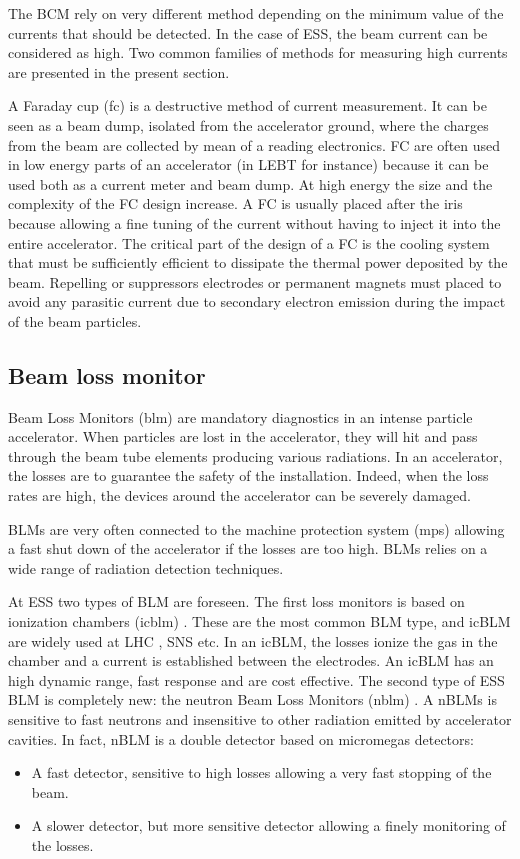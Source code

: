 \begin{refsection}
  The BCM rely on very different method depending on the minimum value of the currents that should be detected. In the case of ESS, the beam current can be considered as high. Two common families of methods for measuring high currents are presented in the present section.

  A Faraday cup (\acrshort{fc}) is a destructive method of current measurement. It can be seen as a beam dump, isolated from the accelerator ground, where the charges from the beam are collected by mean of a reading electronics. FC are often used in low energy parts of an accelerator (in LEBT for instance) because it can be used both as a current meter and beam dump. At high energy the size and the complexity of the FC design increase. A FC is usually placed after the iris because allowing a fine tuning of the current without having to inject it into the entire accelerator. The critical part of the design of a FC is the cooling system that must be sufficiently efficient to dissipate the thermal power deposited by the beam. Repelling or suppressors electrodes or permanent magnets must placed to avoid any parasitic current due to secondary electron emission during the impact of the beam particles.

  
  \subsection{Beam loss monitor}
  Beam Loss Monitors (\acrshort{blm}) are mandatory diagnostics in an intense particle accelerator. When particles are lost in the accelerator, they will hit and pass through the beam tube elements producing various radiations. In an accelerator, the losses are  to guarantee the safety of the installation. Indeed, when the loss rates are high, the devices around the accelerator can be severely damaged.

  BLMs are very often connected to the machine protection system (\acrshort{mps}) allowing a fast shut down of the accelerator if the losses are too high. BLMs relies on a wide range of radiation detection techniques.

  At ESS two types of BLM are foreseen. The first loss monitors is based on ionization chambers (\acrshort{icblm}) \cite{Grishin:IBIC2017-WEPWC03}. These are the most common BLM type, and icBLM are widely used at LHC \cite{HOLZER20122055}, SNS etc. In an icBLM, the losses ionize the gas in the chamber and a current is established between the electrodes. An icBLM has an high dynamic range, fast response and are cost effective.
  The second type of ESS BLM is completely new: the neutron Beam Loss Monitors (\acrshort{nblm}) \cite{Papaevangelou:HB2018-THA1WE04}.
  A nBLMs is sensitive to fast neutrons and insensitive to other radiation emitted by accelerator cavities. In fact, nBLM is a double detector based on micromegas detectors:
  \begin{itemize}
    \item A fast detector, sensitive to high losses allowing a very fast stopping of the beam.
    \item A slower detector, but more sensitive detector allowing a finely monitoring of the losses.
  \end{itemize}


\end{refsection}
